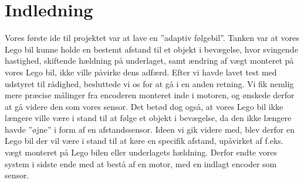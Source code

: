 \graphicspath{{Chapters/Indledning/}}

\section{Indledning}
Vores første ide til projektet var at lave en ”adaptiv følgebil”. Tanken var at vores Lego bil kunne holde en bestemt afstand til et objekt i bevægelse, hvor svingende hastighed, skiftende hældning på underlaget, samt ændring af vægt monteret på vores Lego bil, ikke ville påvirke dens adfærd.
Efter vi havde lavet test med udstyret til rådighed, besluttede vi os for at gå i en anden retning. Vi fik nemlig mere præcise målinger fra encoderen monteret inde i motoren, og ønskede derfor at gå videre den som vores sensor. Det betød dog også, at vores Lego bil ikke længere ville være i stand til at følge et objekt i bevægelse, da den ikke længere havde ”øjne” i form af en afstandssensor. 
Ideen vi gik videre med, blev derfor en Lego bil der vil være i stand til at køre en specifik afstand, upåvirket af f.eks. vægt monteret på Lego bilen eller underlagets hældning. Derfor endte vores system i sidste ende med at bestå af en motor, med en indlagt encoder som sensor. 

	
\newpage

